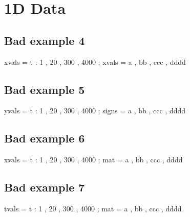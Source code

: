\documentclass[12pt]{article}
\begin{document}


\section{1D Data}

%
%
%
%
%
%
%


\subsection{Bad example 4}

\begin{functable}
    xvals = t : 1 , 20 , 300 , 4000 ;
    xvals = a , bb , ccc , dddd 
\end{functable}


\subsection{Bad example 5}

\begin{functable}
    yvals = t : 1 , 20 , 300 , 4000 ;
    signs = a , bb , ccc , dddd 
\end{functable}


\subsection{Bad example 6}

\begin{functable}
    xvals = t : 1 , 20 , 300 , 4000 ;
    mat   = a , bb , ccc , dddd 
\end{functable}


\subsection{Bad example 7}

\begin{functable}
    tvals = t : 1 , 20 , 300 , 4000 ;
    mat   = a , bb , ccc , dddd 
\end{functable}
\end{document}
